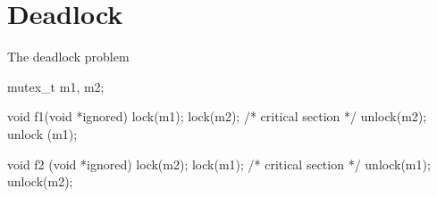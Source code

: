 \documentclass[11pt,aspectratio=169]{beamer}
\begin{document}
% 
% 
% 

\section{Deadlock}

\begin{slide}{The deadlock problem}
\vspace{-1em}
\begin{ccode}
  mutex_t m1, m2;

  void f1(void *ignored) {
    lock(m1);
    lock(m2);
    /* critical section */
    unlock(m2);
    unlock (m1);
  }

  void f2 (void *ignored) {
    lock(m2);
    lock(m1);
    /* critical section */
    unlock(m1);
    unlock(m2);
  }
\end{ccode}
\end{slide}
\end{document}
